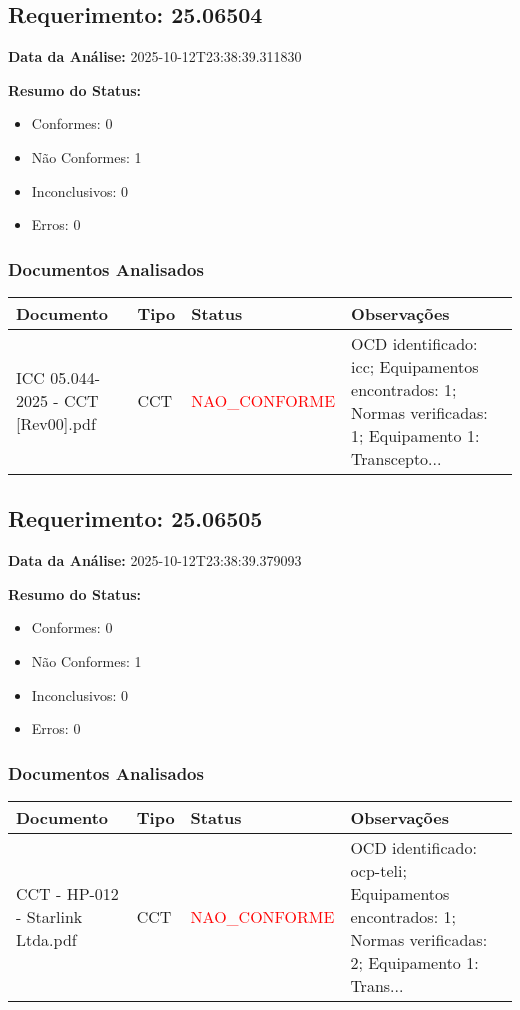 \documentclass[12pt,a4paper]{article}
\begin{document}
\subsection{Requerimento: 25.06504}

\textbf{Data da Análise:} 2025-10-12T23:38:39.311830

\textbf{Resumo do Status:}
\begin{itemize}
    \item Conformes: 0
    \item Não Conformes: 1
    \item Inconclusivos: 0
    \item Erros: 0
\end{itemize}

\subsubsection{Documentos Analisados}

\begin{longtable}{|p{4cm}|p{2cm}|p{2cm}|p{6cm}|}
\hline
\textbf{Documento} & \textbf{Tipo} & \textbf{Status} & \textbf{Observações} \\
\hline
\endhead
ICC 05.044-2025 - CCT [Rev00].pdf & CCT & \textcolor{red}{NAO\_CONFORME} & OCD identificado: icc; Equipamentos encontrados: 1; Normas verificadas: 1; Equipamento 1: Transcepto... \\
\hline
\end{longtable}


\subsection{Requerimento: 25.06505}

\textbf{Data da Análise:} 2025-10-12T23:38:39.379093

\textbf{Resumo do Status:}
\begin{itemize}
    \item Conformes: 0
    \item Não Conformes: 1
    \item Inconclusivos: 0
    \item Erros: 0
\end{itemize}

\subsubsection{Documentos Analisados}

\begin{longtable}{|p{4cm}|p{2cm}|p{2cm}|p{6cm}|}
\hline
\textbf{Documento} & \textbf{Tipo} & \textbf{Status} & \textbf{Observações} \\
\hline
\endhead
CCT - HP-012 - Starlink Ltda.pdf & CCT & \textcolor{red}{NAO\_CONFORME} & OCD identificado: ocp-teli; Equipamentos encontrados: 1; Normas verificadas: 2; Equipamento 1: Trans... \\
\hline
\end{longtable}
\end{document}
